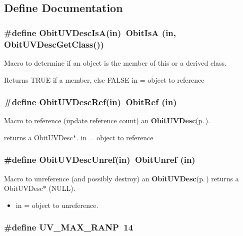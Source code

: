 \subsection{Define Documentation}
\subsubsection{\setlength{\rightskip}{0pt plus 5cm}\#define Obit\-UVDesc\-Is\-A(in)\ Obit\-Is\-A (in, Obit\-UVDesc\-Get\-Class())}\label{ObitUVDesc_8h_a2}


Macro to determine if an object is the member of this or a derived class. 

Returns TRUE if a member, else FALSE in = object to reference 
\subsubsection{\setlength{\rightskip}{0pt plus 5cm}\#define Obit\-UVDesc\-Ref(in)\ Obit\-Ref (in)}\label{ObitUVDesc_8h_a1}


Macro to reference (update reference count) an {\bf Obit\-UVDesc}{\rm (p.\,\pageref{structObitUVDesc})}. 

returns a Obit\-UVDesc$\ast$. in = object to reference 
\subsubsection{\setlength{\rightskip}{0pt plus 5cm}\#define Obit\-UVDesc\-Unref(in)\ Obit\-Unref (in)}\label{ObitUVDesc_8h_a0}


Macro to unreference (and possibly destroy) an {\bf Obit\-UVDesc}{\rm (p.\,\pageref{structObitUVDesc})} returns a Obit\-UVDesc$\ast$ (NULL). 

\begin{itemize}
\item in = object to unreference. \end{itemize}
\subsubsection{\setlength{\rightskip}{0pt plus 5cm}\#define UV\_\-MAX\_\-RANP\ 14}\label{ObitUVDesc_8h_a4}


